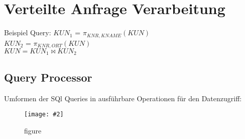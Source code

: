 \documentclass[a4paper,10pt,titlepage=false]{scrreprt}
\newcommand{\pic}[2][figure]{\begin{figure}[h]
 \centering
 \texttt{[image: \#2]}
 \caption{#1}
\end{figure}
}
\begin{document}
\chapter{Verteilte Anfrage Verarbeitung}

\begin{framed}
 Beispiel Query:
$KUN_1$ = $\pi_{KNR,KNAME}(KUN)$ \\
$KUN_2$ = $\pi_{KNR,ORT}(KUN)$\\
$KUN = KUN_1 \bowtie KUN_2$ \\
\end{framed}

\section{Query Processor}
Umformen der SQl Queries in ausführbare Operationen für den Datenzugriff:

\pic{qproc.png}
\end{document}
